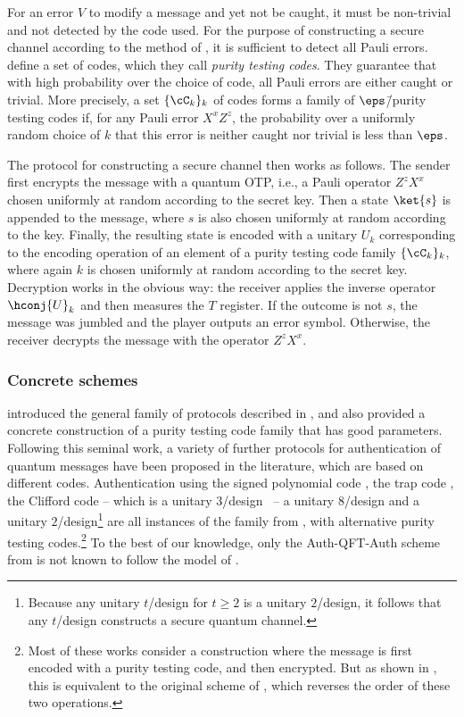 For an error $V$ to modify a message and yet not be caught, it must be
non-trivial and not detected by the code used. For the purpose of
constructing a secure channel according to the method of
\textcite{BCGST02}, it is sufficient to detect all Pauli
errors. \textcite{BCGST02} define a set of codes, which they call
\emph{purity testing codes}. They guarantee that with high probability
over the choice of code, all Pauli errors are either caught or
trivial. More precisely, a set $\{\cC_k\}_k$ of codes forms a family
of $\eps$\=/purity testing codes if, for any Pauli error $X^xZ^z$, the
probability over a uniformly random choice of $k$ that this error is
neither caught nor trivial is less than $\eps$.

The protocol for constructing a secure channel then works as
follows. The sender first encrypts the message with a quantum OTP,
i.e., a Pauli operator $Z^zX^x$ chosen uniformly at random according
to the secret key. Then a state $\ket{s}$ is appended to the message,
where $s$ is also chosen uniformly at random according to the
key. Finally, the resulting state is encoded with a unitary $U_k$
corresponding to the encoding operation of an element of a purity
testing code family $\{\cC_{k}\}_{k}$, where again $k$ is chosen
uniformly at random according to the secret key. Decryption works in
the obvious way: the receiver applies the inverse operator
$\hconj{U}_k$ and then measures the $T$ register. If the outcome is
not $s$, the message was jumbled and the player outputs an error
symbol. Otherwise, the receiver decrypts the message with the operator
$Z^zX^x$.

\subsubsection{Concrete schemes}
\label{sec:qmt.related}


\textcite{BCGST02} introduced the general family of protocols
described in , and also provided a concrete
construction of a purity testing code family that has good
parameters. Following this seminal work, a variety of further
protocols for authentication of quantum messages have been proposed in
the literature, which are based on different codes. Authentication
using the signed polynomial code \cite{BCGHS06,ABE10}, the trap code
\cite{BGS13,BW16}, the Clifford code \cite{ABE10,DNS12,BW16} \---
which is a unitary $3$\-/design~\cite{Web15,Zhu17} \--- a unitary
$8$\-/design \cite{GYZ17} and a unitary $2$\-/design\footnote{Because
  any unitary $t$\-/design for $t \geq 2$ is a unitary $2$\-/design,
  it follows that any $t$\-/design constructs a secure quantum
  channel.}  \cite{Por17,AM17} are all instances of the family from
\textcite{BCGST02}, with alternative purity testing
codes.\footnote{Most of these works consider a construction where the
  message is first encoded with a purity testing code, and then
  encrypted. But as shown in \textcite{Por17}, this is equivalent to
  the original scheme of \textcite{BCGST02}, which reverses the order
  of these two operations.} To the best of our knowledge, only the
Auth-QFT-Auth scheme from \textcite{GYZ17} is not known to follow the
model of \textcite{BCGST02}.

